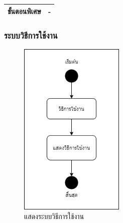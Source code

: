 \documentclass[12pt,oneside,openright,a4paper]{cpe-thai-project}
\begin{document}
\begin{table}[!h]
\begin{tabular}{|l|l|}
  ขั้นตอนพิเศษ    & -                                                                                                                                                                                                                                                                                                                                                          \\ \hline
  \end{tabular}
\end{table}

\newpage


\subsubsection{ระบบวิธีการใช้งาน}

\begin{figure}[!h]
  \centering
  \includegraphics[width=5cm]{./image/ad-howTOuse.png}
  \caption{แสดงระบบวิธีการใช้งาน}
  \label{fig:ad-howTouse}
\end{figure}
\end{document}
